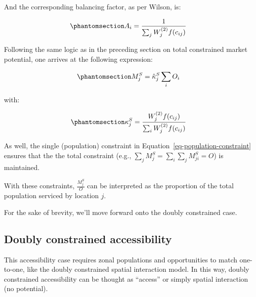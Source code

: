 \documentclass[
]{article}
\begin{document}
And the corresponding balancing factor, as per Wilson, is:

\begin{equation}\phantomsection\label{eq-population-constrained-proportionality-constants}{
A_i = \frac{1}{\sum_j W_j^{(2)} f(c_{ij})}
}\end{equation}

Following the same logic as in the preceding section on total
constrained market potential, one arrives at the following expression:

\begin{equation}\phantomsection\label{eq-production-constrained-accessibility-with-proportional-allocation-factor}{
M^S_{j} = \hat \kappa^S_{j} \sum_i  O_i
}\end{equation}

\noindent with:

\begin{equation}\phantomsection\label{eq-attraction-constrained-proportional-allocation-factor}{
\kappa^S _{j} = \frac{W_j^{(2)} f(c_{ij})}{\sum_i W_j^{(2)} f(c_{ij})}
}\end{equation}

As well, the single (population) constraint in
Equation~\ref{eq-population-constraint} ensures that the the total
constraint (e.g., \(\sum_j M^S_{j} = \sum_i\sum_j  M^S_{ji} = O\)) is
maintained.

With these constraints, \(\frac{M_j^S}{O}\) can be interpreted as the
proportion of the total population serviced by location \(j\).

For the sake of brevity, we'll move forward onto the doubly constrained
case.

\subsection{Doubly constrained
accessibility}\label{doubly-constrained-accessibility}

This accessibility case requires zonal populations and opportunities to
match one-to-one, like the doubly constrained spatial interaction model.
In this way, doubly constrained accessibility can be thought as
``access'' or simply spatial interaction (no potential).
\end{document}
